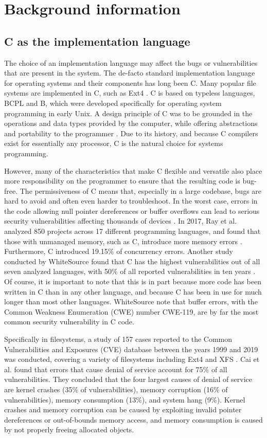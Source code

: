 \section{Background information}
\subsection{C as the implementation language}
The choice of an implementation language may affect the bugs or vulnerabilities that are present in the system.
The de-facto standard implementation language for operating systems and their components has long been C.
Many popular file systems are implemented in C, such as Ext4 \cite{ext4code}.
C is based on typeless languages, BCPL and B, which were developed specifically for operating system programming in early Unix.
A design principle of C was to be grounded in the operations and data types provided by the computer, while offering abstractions and portability to the programmer \cite{ritchie1993}.
Due to its history, and because C compilers exist for essentially any processor, C is the natural choice for systems programming.

However, many of the characteristics that make C flexible and versatile also place more responsibility on the programmer to ensure that the resulting code is bug-free.
The permissiveness of C means that, especially in a large codebase, bugs are hard to avoid and often even harder to troubleshoot.
In the worst case, errors in the code allowing null pointer dereferences or buffer overflows can lead to serious security vulnerabilities affecting thousands of devices \cite{cert2001}.
In 2017, Ray et al. analyzed 850 projects across 17 different programming languages, and found that those with unmanaged memory, such as C, introduce more memory errors \cite{ray2017}.
Furthermore, C introduced 19.15\% of concurrency errors.
Another study conducted by WhiteSource found that C has the highest vulnerabilities out of all seven analyzed languages, with 50\% of all reported vulnerabilities in ten years \cite{whitesource2019}.
Of course, it is important to note that this is in part because more code has been written in C than in any other language, and because C has been in use for much longer than most other languages.
WhiteSource note that buffer errors, with the Common Weakness Enumeration (CWE) number CWE-119, are by far the most common security vulnerability in C code.

Specifically in filesystems, a study of 157 cases reported to the Common Vulnerabilities and Exposures (CVE) database between the years 1999 and 2019 was conducted, covering a variety of filesystems including Ext4 and XFS \cite{cai2019}.
Cai et al. found that errors that cause denial of service account for 75\% of all vulnerabilities.
They concluded that the four largest causes of denial of service are kernel crashes (35\% of vulnerabilities), memory corruption (16\% of vulnerabilities), memory consumption (13\%), and system hang (9\%).
Kernel crashes and memory corruption can be caused by exploiting invalid pointer dereferences or out-of-bounds memory access, and memory consumption is caused by not properly freeing allocated objects.


